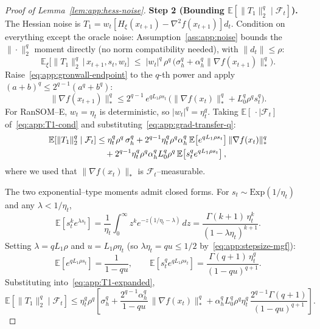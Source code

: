 \documentclass{article}
\theoremstyle{plain}
\theoremstyle{definition}
\theoremstyle{remark}
\begin{document}
\begin{proof}[Proof of Lemma~\ref{lem:app:hess-noise}]
\smallskip\noindent\textbf{Step 2 (Bounding $\mathbb{E}[\|T_1\|_2^q \mid \mathcal{F}_t]$).}
The Hessian noise is $T_1 = w_t [H_\xi(x_{t+1}) - \nabla^2 f(x_{t+1})]
d_t$. Condition on everything except the oracle noise:
Assumption~\ref{ass:app:noise} bounds the $\|\cdot\|_2^q$ moment
directly (no norm compatibility needed), with $\|d_t\| \leq \rho$:
\begin{equation}
  \mathbb{E}_\xi\bigl[\|T_1\|_2^q \,\big|\, x_{t+1}, s_t, w_t\bigr]
  \;\leq\; |w_t|^q\, \rho^q\,
    \bigl(\sigma_h^q + \alpha_h^q \|\nabla f(x_{t+1})\|_*^q\bigr).
  \label{eq:app:T1-cond}
\end{equation}
Raise~\eqref{eq:app:gronwall-endpoint} to the $q$-th power and apply
$(a+b)^q \leq 2^{q-1}(a^q + b^q)$:
\begin{equation}
  \|\nabla f(x_{t+1})\|_*^q
  \leq 2^{q-1}\, e^{q L_1 \rho s_t}\,
    \bigl(\|\nabla f(x_t)\|_*^q + L_0^q \rho^q s_t^q\bigr).
  \label{eq:app:grad-transfer-q}
\end{equation}
For RanSOM--E, $w_t = \eta_t$ is deterministic, so $|w_t|^q = \eta_t^q$.
Taking $\mathbb{E}[\,\cdot \mid \mathcal{F}_t]$ of~\eqref{eq:app:T1-cond}
and substituting~\eqref{eq:app:grad-transfer-q}:
\begin{align}
  \mathbb{E}[\|T_1\|_2^q \mid \mathcal{F}_t]
  &\leq \eta_t^q\rho^q\,\sigma_h^q
    + 2^{q-1}\eta_t^q \rho^q\alpha_h^q\,
      \mathbb{E}\!\left[e^{qL_1\rho s_t}\right] \|\nabla f(x_t)\|_*^q
  \notag \\
  &\quad + 2^{q-1}\eta_t^q \rho^q\alpha_h^q L_0^q \rho^q\,
      \mathbb{E}\!\left[s_t^q e^{qL_1\rho s_t}\right],
  \label{eq:app:T1-expanded}
\end{align}
where we used that $\|\nabla f(x_t)\|_*$ is $\mathcal{F}_t$--measurable.

The two exponential--type moments admit closed forms. For $s_t \sim
\mathrm{Exp}(1/\eta_t)$ and any $\lambda < 1/\eta_t$,
\begin{equation}
  \mathbb{E}\!\left[s_t^k e^{\lambda s_t}\right]
  = \frac{1}{\eta_t}\int_0^\infty z^k e^{-z(1/\eta_t - \lambda)}\,dz
  = \frac{\Gamma(k+1)\,\eta_t^k}{(1 - \lambda \eta_t)^{k+1}}.
  \label{eq:app:exp-moment}
\end{equation}
Setting $\lambda = qL_1\rho$ and $u = L_1\rho\eta_t$ (so $\lambda\eta_t =
qu \leq 1/2$ by~\eqref{eq:app:stepsize-mgf}):
\begin{equation}
  \mathbb{E}[e^{qL_1\rho s_t}] = \frac{1}{1 - qu}, \qquad
  \mathbb{E}[s_t^q e^{qL_1\rho s_t}]
    = \frac{\Gamma(q+1)\, \eta_t^q}{(1 - qu)^{q+1}}.
  \label{eq:app:exp-mgf}
\end{equation}
Substituting into~\eqref{eq:app:T1-expanded},
\begin{equation}
  \mathbb{E}[\|T_1\|_2^q \mid \mathcal{F}_t]
  \leq \eta_t^q \rho^q \!\left[\sigma_h^q
    + \frac{2^{q-1}\alpha_h^q}{1 - qu}\, \|\nabla f(x_t)\|_*^q
    + \alpha_h^q L_0^q \rho^q \eta_t^q\,
      \frac{2^{q-1}\Gamma(q+1)}{(1-qu)^{q+1}}\right].
  \label{eq:app:T1-final}
\end{equation}


\end{proof}
\end{document}
